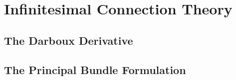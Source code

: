 \chapter{Infinitesimal Connection Theory}

\section{The Darboux Derivative}

\section{}

\section{The Principal Bundle Formulation}

\section{}

\section{}